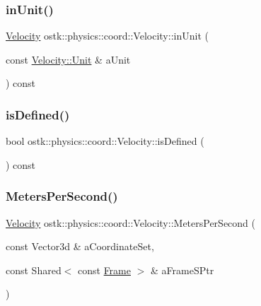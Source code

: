 \mbox{\label{classostk_1_1physics_1_1coord_1_1_velocity_abafe2a4415f6bee5cdb0abd2c0b7d3dd}} 
\subsubsection{\texorpdfstring{in\+Unit()}{inUnit()}}
{\footnotesize\ttfamily \hyperlink{classostk_1_1physics_1_1coord_1_1_velocity}{Velocity} ostk\+::physics\+::coord\+::\+Velocity\+::in\+Unit (\begin{DoxyParamCaption}\item[{const \hyperlink{classostk_1_1physics_1_1coord_1_1_velocity_a01701e56094328a31d0211da5ac1ba28}{Velocity\+::\+Unit} \&}]{a\+Unit }\end{DoxyParamCaption}) const}

\mbox{\label{classostk_1_1physics_1_1coord_1_1_velocity_a19318a3cef12b4248cd12e043ee41591}} 
\subsubsection{\texorpdfstring{is\+Defined()}{isDefined()}}
{\footnotesize\ttfamily bool ostk\+::physics\+::coord\+::\+Velocity\+::is\+Defined (\begin{DoxyParamCaption}{ }\end{DoxyParamCaption}) const}

\mbox{\label{classostk_1_1physics_1_1coord_1_1_velocity_a9c21dc239f2109c9698ac752b3d395b7}} 
\subsubsection{\texorpdfstring{Meters\+Per\+Second()}{MetersPerSecond()}}
{\footnotesize\ttfamily \hyperlink{classostk_1_1physics_1_1coord_1_1_velocity}{Velocity} ostk\+::physics\+::coord\+::\+Velocity\+::\+Meters\+Per\+Second (\begin{DoxyParamCaption}\item[{const Vector3d \&}]{a\+Coordinate\+Set,  }\item[{const Shared$<$ const \hyperlink{classostk_1_1physics_1_1coord_1_1_frame}{Frame} $>$ \&}]{a\+Frame\+S\+Ptr }\end{DoxyParamCaption})\hspace{0.3cm}{\ttfamily [static]}}

